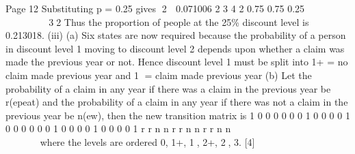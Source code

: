 \documentclass[a4paper,12pt]{article}
\begin{document}
Page 12
Substituting p = 0.25 gives 2  0.071006
2
3 4 2
0.75 0.75
0.25
        
 
 32
Thus the proportion of people at the 25\% discount level is 0.213018. 
(iii) (a) Six states are now required
because the probability of a person in discount level 1 moving to
discount level 2 depends upon whether a claim was made the previous
year or not.
Hence discount level 1 must be split into
1+ = no claim made previous year and
1 = claim made previous year
(b) Let the probability of a claim in any year if there was a claim in the
previous year be r(epeat) and the probability of a claim in any year if
there was not a claim in the previous year be n(ew), then the new
transition matrix is
1 0 0 0 0
0 0 1 0 0
0 0 1 0 0
0 0 0 0 1
0 0 0 0 1
0 0 0 0 1
r r
n n
r r
n n
r r
n n
  
    
  
 
  
  
    
where the levels are ordered 0, 1+, 1, 2+, 2, 3. [4]

\end{document}
